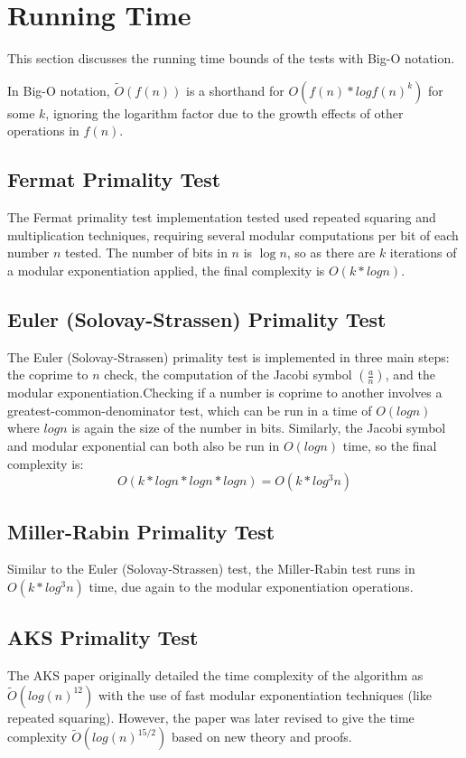 \documentclass{article}
\begin{document}
\section{Running Time}
This section discusses the running time bounds of the tests with Big-O notation.

In Big-O notation, $\widetilde{O}(f(n))$ is a shorthand for $O(f(n) * log{f(n)}^k)$ for some $k$, ignoring the logarithm factor due to the growth effects of other operations in $f(n)$.

\subsection{Fermat Primality Test}
The Fermat primality test implementation tested used repeated squaring and multiplication techniques, requiring several modular computations per bit of each number $n$ tested. The number of bits in $n$ is $\log{n}$, so as there are $k$ iterations of a modular exponentiation applied, the final complexity is $O(k * log{n})$.

\subsection{Euler (Solovay-Strassen) Primality Test}
The Euler (Solovay-Strassen) primality test is implemented in three main steps: the coprime to $n$ check, the computation of the Jacobi symbol $(\frac{a}{n})$, and the modular exponentiation.Checking if a number is coprime to another involves a greatest-common-denominator test, which can be run in a time of $O(log{n})$ where $log{n}$ is again the size of the number in bits. Similarly, the Jacobi symbol and modular exponential can both also be run in $O(log{n})$ time, so the final complexity is:
\[
    O(k * log{n} * log{n} * log{n}) = O(k * log^3{n})
\]

\subsection{Miller-Rabin Primality Test}
Similar to the Euler (Solovay-Strassen) test, the Miller-Rabin test runs in $O(k * log^3{n})$ time, due again to the modular exponentiation operations.

\subsection{AKS Primality Test}
The AKS paper originally detailed the time complexity of the algorithm as $\widetilde{O}(log(n)^{12})$ with the use of fast modular exponentiation techniques (like repeated squaring). However, the paper was later revised to give the time complexity $\widetilde{O}(log(n)^{15/2})$ based on new theory and proofs.
\end{document}
